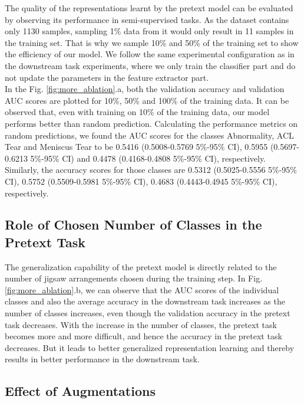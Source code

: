 \documentclass[journal]{IEEEtai}
\begin{document}
The quality of the representations learnt by the pretext model can be evaluated by observing its performance in semi-supervised tasks. As the dataset contains only 1130 samples, sampling 1\% data from it would only result in 11 samples in the training set. That is why we sample 10\% and 50\% of the training set to show the efficiency of our model. We follow the same experimental configuration as in the downstream task experiments, where we only train the classifier part and do not update the parameters in the feature extractor part.\\
\indent
In the Fig. \ref{fig:more_ablation}.a, both the validation accuracy and validation AUC scores are plotted for 10\%, 50\% and 100\% of the training data. It can be observed that, even with training on 10\% of the training data, our model performs better than random prediction. Calculating the performance metrics on random predictions, we found the AUC scores for the classes Abnormality, ACL Tear and Meniscus Tear to be 0.5416 (0.5008-0.5769 5\%-95\% CI), 0.5955 (0.5697-0.6213 5\%-95\% CI) and 0.4478 (0.4168-0.4808 5\%-95\% CI), respectively. Similarly, the accuracy scores for those classes are 0.5312 (0.5025-0.5556 5\%-95\% CI), 0.5752 (0.5509-0.5981 5\%-95\% CI), 0.4683 (0.4443-0.4945 5\%-95\% CI), respectively.


\subsection{Role of Chosen Number of Classes in the Pretext Task}
\label{subsec:num_classes}

The generalization capability of the pretext model is directly related to the number of jigsaw arrangements chosen during the training step. In Fig. \ref{fig:more_ablation}.b, we can observe that the AUC scores of the individual classes and also the average accuracy in the downstream task increases as the number of classes increases, even though the validation accuracy in the pretext task decreases. With the increase in the number of classes, the pretext task becomes more and more difficult, and hence the accuracy in the pretext task decreases. But it leads to better generalized representation learning and thereby results in better performance in the downstream task. 

\subsection{Effect of Augmentations}
\label{subsec:aug_eff}
\end{document}

